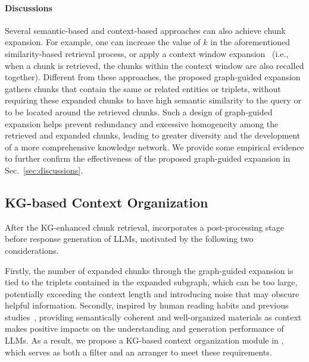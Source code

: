 \paragraph{Discussions}
Several semantic-based and context-based approaches can also achieve chunk expansion. For example, one can increase the value of $k$ in the aforementioned similarity-based retrieval process, or apply a context window expansion~\cite{jiang23arag} (i.e., when a chunk is retrieved, the chunks within the context window are also recalled together). Different from these approaches, the proposed graph-guided expansion gathers chunks that contain the same or related entities or triplets, without requiring these expanded chunks to have high semantic similarity to the query or to be located around the retrieved chunks. 
Such a design of graph-guided expansion helps prevent redundancy and excessive homogeneity among the retrieved and expanded chunks, leading to greater diversity and the development of a more comprehensive knowledge network.
We provide some empirical evidence to further confirm the effectiveness of the proposed graph-guided expansion in Sec.~\ref{sec:discussions}.

\subsection{KG-based Context Organization}
\label{subsec:context}
After the KG-enhanced chunk retrieval, \modelname incorporates a post-processing stage before response generation of LLMs, motivated by the following two considerations.

Firstly, the number of expanded chunks through the graph-guided expansion is tied to the triplets contained in the expanded subgraph, which can be too large, potentially exceeding the context length and introducing noise that may obscure helpful information.
Secondly, inspired by human reading habits and previous studies~\cite{li23promptsurvey,liu24lost}, providing semantically coherent and well-organized materials as context makes positive impacts on the understanding and generation performance of LLMs.
As a result, we propose a KG-based context organization module in \modelname, which serves as both a filter and an arranger to meet these requirements.

